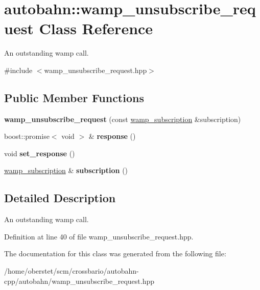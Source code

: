 \hypertarget{classautobahn_1_1wamp__unsubscribe__request}{}\section{autobahn\+:\+:wamp\+\_\+unsubscribe\+\_\+request Class Reference}
\label{classautobahn_1_1wamp__unsubscribe__request}


An outstanding wamp call.  




{\ttfamily \#include $<$wamp\+\_\+unsubscribe\+\_\+request.\+hpp$>$}

\subsection*{Public Member Functions}
\begin{DoxyCompactItemize}
\item 
{\bfseries wamp\+\_\+unsubscribe\+\_\+request} (const \hyperlink{classautobahn_1_1wamp__subscription}{wamp\+\_\+subscription} \&subscription)\hypertarget{classautobahn_1_1wamp__unsubscribe__request_a45080817166fd5b0b54d2cc80a17f6e6}{}\label{classautobahn_1_1wamp__unsubscribe__request_a45080817166fd5b0b54d2cc80a17f6e6}

\item 
boost\+::promise$<$ void $>$ \& {\bfseries response} ()\hypertarget{classautobahn_1_1wamp__unsubscribe__request_a9247f58115cea55e7284d42a200ebe55}{}\label{classautobahn_1_1wamp__unsubscribe__request_a9247f58115cea55e7284d42a200ebe55}

\item 
void {\bfseries set\+\_\+response} ()\hypertarget{classautobahn_1_1wamp__unsubscribe__request_af53e6f0de874f14a3c9b76533c9b6093}{}\label{classautobahn_1_1wamp__unsubscribe__request_af53e6f0de874f14a3c9b76533c9b6093}

\item 
\hyperlink{classautobahn_1_1wamp__subscription}{wamp\+\_\+subscription} \& {\bfseries subscription} ()\hypertarget{classautobahn_1_1wamp__unsubscribe__request_a7178d0fa1fc273fd20d3484f0e64c9d2}{}\label{classautobahn_1_1wamp__unsubscribe__request_a7178d0fa1fc273fd20d3484f0e64c9d2}

\end{DoxyCompactItemize}


\subsection{Detailed Description}
An outstanding wamp call. 

Definition at line 40 of file wamp\+\_\+unsubscribe\+\_\+request.\+hpp.



The documentation for this class was generated from the following file\+:\begin{DoxyCompactItemize}
\item 
/home/oberstet/scm/crossbario/autobahn-\/cpp/autobahn/wamp\+\_\+unsubscribe\+\_\+request.\+hpp\end{DoxyCompactItemize}
